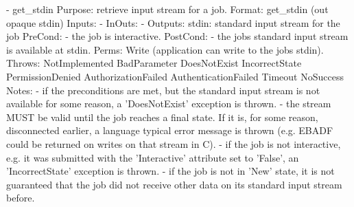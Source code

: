 \begin{myspec}
 
    - get_stdin 
      Purpose:  retrieve input stream for a job.
      Format:   get_stdin          (out opaque stdin)
      Inputs:   -
      InOuts:   -
      Outputs:  stdin:              standard input stream for
                                    the job
      PreCond:  - the job is interactive.
      PostCond: - the jobs standard input stream is available 
                  at stdin.
      Perms:    Write (application can write to the jobs stdin).
      Throws:   NotImplemented
                BadParameter
                DoesNotExist
                IncorrectState
                PermissionDenied
                AuthorizationFailed
                AuthenticationFailed
                Timeout
                NoSuccess
      Notes:    - if the preconditions are met, but the standard
                  input stream is not available for some 
                  reason, a 'DoesNotExist' exception is thrown.
                - the stream MUST be valid until the job reaches
                  a final state.  If it is, for some reason,
                  disconnected earlier, a language typical error
                  message is thrown (e.g. EBADF could be 
                  returned on writes on that stream in C).
                - if the job is not interactive, e.g. it was
                  submitted with the 'Interactive' attribute set
                  to 'False', an 'IncorrectState' exception is
                  thrown.
                - if the job is not in 'New' state, it is not
                  guaranteed that the job did not receive other
                  data on its standard input stream before.
 

\end{myspec}
